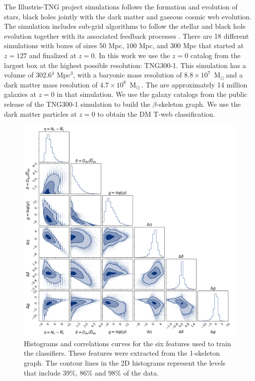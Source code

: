 \documentclass[usenatbib]{mnras}
\newcommand{\Msun}{\,{\rm M}$_{\odot}$\,}
\begin{document}
The Illustris-TNG project simulations follows the formation and evolution of stars, black holes jointly with the dark matter and gaseous cosmic web evolution.
The simulation includes sub-grid algorithms to follow the stellar and black hole evolution together with its associated feedback processes \citep{Nelson2019,Springel2018}.
There are 18 different simulations with boxes of sizes $50$ Mpc, $100$ Mpc, and $300$ Mpc that started at $z=127$ and finalized at $z=0$.    
In this work we use the $z=0$ catalog from the largest box at the highest possible resolution: TNG300-1.
This simulation has a volume of 302.6$^3$ Mpc$^3$, with a baryonic mass resolution of $8.8\times 10^{7}$ \Msun and a dark matter mass resolution of $4.7\times  10^{8}$ \Msun \citep{Nelson2019}.
The are approximately 14 million galaxies at $z=0$ in that simulation.
We use the galaxy catalogs from the public release of the TNG300-1 simulation \citep{Pillepich2018a} to build the $\beta$-skeleton graph.
We use the dark matter particles at $z=0$ to obtain the DM T-web classification.
 

\begin{figure}
        \includegraphics[scale=0.46]{Figs/p_all_features_correlations.pdf}
    \caption{Histograms and correlations curves for the six features used to train the classifiers. These features were extracted from the 1-skeleton graph. The contour lines in the 2D histograms represent the levels that include 39\%, 86\% and 98\% of the data.}
    \label{fig:features}
\end{figure}
\end{document}
